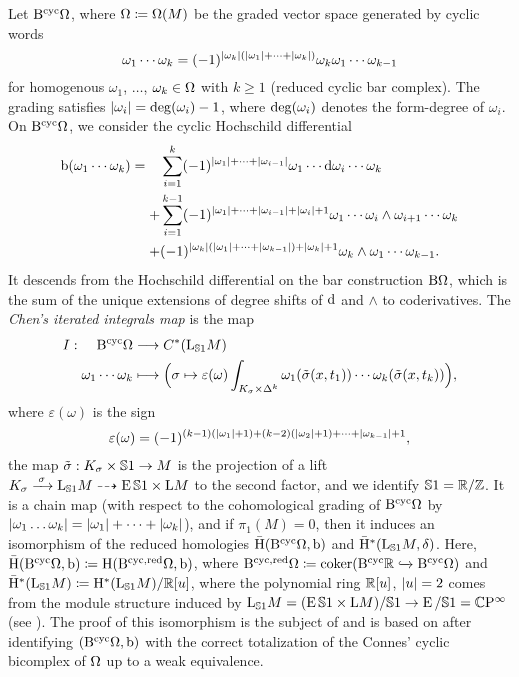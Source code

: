 \documentclass[\MainFolder/Text.tex]{subfiles}
\begin{document}
Let $\mathrm{B}^{\mathrm{cyc}} \Omega$, where $\Omega \coloneqq \Omega(M)$ be the graded vector space generated by cyclic words 
$$ \omega_1\dotsb\omega_k = (-1)^{|\omega_k|(|\omega_1|+\dotsb+|\omega_k|)} \omega_k\omega_1 \dotsb \omega_{k-1} $$
for homogenous $\omega_1$, $\dotsc$, $\omega_k \in \Omega$ with $k\ge 1$ (reduced cyclic bar complex). The grading satisfies $|\omega_i| = \operatorname{deg}(\omega_i) - 1$, where $\operatorname{deg}(\omega_i)$ denotes the form-degree of $\omega_i$. On $\mathrm{B}^{\mathrm{cyc}} \Omega$, we consider the cyclic Hochschild differential
$$ \mathrm{b}(\omega_1 \dotsb \omega_k) = \begin{aligned}[t]
&\sum_{i=1}^k (-1)^{|\omega_1| + \dotsb + |\omega_{i-1}|}\omega_1 \dotsb\mathrm{d}\omega_i\dotsb \omega_k \\
+&\sum_{i=1}^{k-1} (-1)^{|\omega_1|+\dotsb + |\omega_{i-1}| + |\omega_i| + 1}\omega_1 \dotsb \omega_i \wedge \omega_{i+1} \dotsb \omega_k\\
+&(-1)^{|\omega_k|(|\omega_1| + \dotsb + |\omega_{k-1}|) + |\omega_k| + 1}\omega_k \wedge \omega_1 \dotsb \omega_{k-1}.
\end{aligned}$$
It descends from the Hochschild differential on the bar construction $\mathrm{B} \Omega$, which is the sum of the unique extensions of degree shifts of $\mathrm{d}$ and $\wedge$ to coderivatives. The \emph{Chen's iterated integrals map} is the map
$$ I: \begin{aligned}[t]
    \mathrm{B}^{\mathrm{cyc}} \Omega& \longrightarrow C^*(\mathrm{L}_{\mathbb{S}{1}} M)\\    
    \omega_1 \dotsb \omega_k & \longmapsto  \Bigl(\sigma \mapsto \varepsilon(\omega) \int_{K_\sigma \times \Delta^k} \omega_1(\tilde{\sigma}(x,t_1)) \dotsb \omega_k(\tilde{\sigma}(x,t_k))\Bigr),
   \end{aligned}$$
where $\varepsilon(\omega)$ is the sign
$$ \varepsilon(\omega) = (-1)^{(k-1)(|\omega_1| + 1) + (k-2)(|\omega_2| + 1) + \dotsb + |\omega_{k-1}| + 1}, $$
the map $\tilde{\sigma}: K_\sigma\times\mathbb{S}{1} \rightarrow M$ is the projection of a lift $K_\sigma \xrightarrow{\hspace{.2em}\sigma\hspace{.2em}}\mathrm{L}_{\mathbb{S}{1}} M \dasharrow \operatorname{E} \mathbb{S}{1} \times \mathrm{L} M$ to the second factor, and we identify $\mathbb{S}{1} = \mathbb{R}/\mathbb{Z}$. It is a chain map (with respect to the cohomological grading of $\mathrm{B}^{\mathrm{cyc}}\Omega$ by $|\omega_1 \dotsc \omega_k| = |\omega_1| + \dotsb + |\omega_k|$), and if $\pi_1(M) = 0$, then it induces an isomorphism of the reduced homologies $\bar{\mathrm{H}}(\mathrm{B}^{\mathrm{cyc}} \Omega,\mathrm{b})$ and $\bar{\mathrm{H}}^*(\mathrm{L}_{\mathbb{S}{1}} M,\delta)$. Here, $\bar{\mathrm{H}}(\mathrm{B}^{\mathrm{cyc}} \Omega,\mathrm{b}) \coloneqq \mathrm{H}(\mathrm{B}^{\mathrm{cyc},\mathrm{red}} \Omega,\mathrm{b})$, where $\mathrm{B}^{\mathrm{cyc},\mathrm{red}} \Omega \coloneqq \operatorname{\mathrm{coker}}(\mathrm{B}^{\mathrm{cyc}} \mathbb{R} \xhookrightarrow{} \mathrm{B}^{\mathrm{cyc}}\Omega)$ and $\bar{\mathrm{H}}^*(\mathrm{L}_{\mathbb{S}{1}} M) \coloneqq \mathrm{H}^*(\mathrm{L}_{\mathbb{S}{1}} M)/\mathbb{R}[u]$, where the polynomial ring $\mathbb{R}[u]$, $|u| = 2$ comes from the module structure induced by $\mathrm{L}_{\mathbb{S}{1}} M = (\operatorname{E} \mathbb{S}{1} \times \mathrm{L} M)/\mathbb{S}{1} \rightarrow \operatorname{E}/\mathbb{S}{1} = \mathbb{C}\mathrm{P}^{\infty}$ (see \cite{Cieliebak2013}). The proof of this isomorphism is the subject of \cite{Cieliebak2018b} and is based on \cite{Getzler} after identifying $(\mathrm{B}^{\mathrm{cyc}} \Omega,\mathrm{b})$ with the correct totalization of the Connes' cyclic bicomplex of $\Omega$ up to a weak equivalence.
\end{document}
